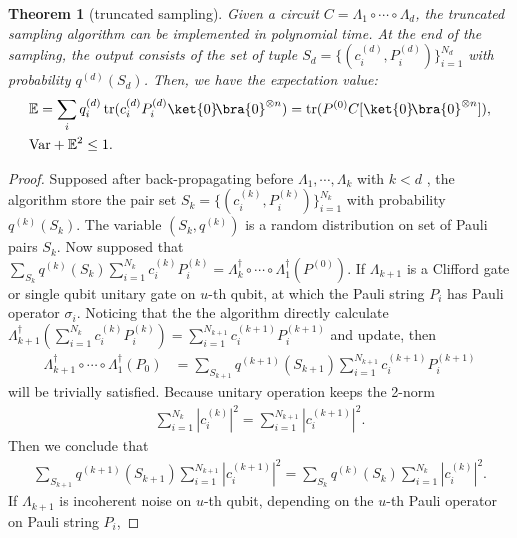 \documentclass[aps,%
twocolumn,%
floatfix,%
pra,%
amsfonts,%
longbibliography,%
groupedaddress,%
superscriptaddress]{revtex4-2}%
\newtheorem{theorem}{Theorem}
\newcommand{\1}{\mathbbm{1}}
\begin{document}
\begin{theorem}[truncated sampling] \label{theo:Multiple-path-sampling-method}
     Given a circuit $C = \Lambda_1 \circ \cdots \circ \Lambda_{d}$, the truncated sampling algorithm can be implemented in polynomial time. At the end of the sampling, the output consists of the set of tuple $S_d = \{(c_i^{(d)}, P_i^{(d)})\}_{i=1}^{N_d}$ with probability $q^{(d)}(S_d)$. Then, we have the expectation value:
\begin{align}
    &\mathbb{E} = \sum_{i} q_i^{(d)} \, \text{tr}(c_i^{(d)} P_i^{(d)} \ket{0}\!\bra{0}^{\otimes n}) = \text{tr}( P^{(0)} C[\ket{0}\!\bra{0}^{\otimes n}] ),\\
        &\text{Var} + \mathbb{E}^2 \leq 1.
\end{align}
\end{theorem}
\begin{proof}
      Supposed after back-propagating before $\Lambda_1, \cdots,\Lambda_k$ with $k < d$ ,  the algorithm store the pair set $ S_k=\{(c_i^{(k)}, P_i^{(k)})\}_{i = 1}^{N_k}$ with probability $q^{(k)}(S_k)$. 
      The variable $(S_k, q^{(k)})$ is a random distribution on set of Pauli pairs $S_k$.
      Now supposed that $\sum_{S_k}q^{(k)}(S_k)\sum_{i =1}^{N_k}  c_i^{(k)}P_i^{(k)} = \Lambda_k^\dagger \circ \cdots\circ\Lambda_1^\dagger(P^{(0)})$. 
  If $\Lambda_{k+1}$ is a Clifford gate or single qubit unitary gate on $u$-th qubit, at which the Pauli string $P_i$ has Pauli operator $\sigma_i$. Noticing that the the algorithm directly calculate $\Lambda_{k+1}^\dagger(\sum_{i =1}^{N_k}c_i^{(k)}P_i^{(k)}) =\sum_{i =1}^{N_{k+1}}c_i^{(k+1)} P_i^{(k+1)}$ and update, then 
      \begin{align}
        \Lambda_{k+1}^\dagger \circ \cdots\circ\Lambda_1^\dagger(P_0) 
        &=\sum_{S_{k+1}}q^{(k+1)}(S_{k+1})\sum_{i =1}^{N_{k+1}}  c_i^{(k+1)}P_i^{(k+1)}
    \end{align}
    will be trivially satisfied. Because unitary operation keeps the 2-norm
    \begin{align}
        \sum_{i =1}^{N_k}|c_i^{(k)}|^2 = \sum_{i =1}^{N_{k+1}}|c_i^{(k+1)}|^2.
    \end{align}
Then we conclude that
\begin{align}
   \sum_{S_{k+1}}q^{(k+1)}(S_{k+1}) \sum_{i= 1}^{N_{k+1}} |c_i^{(k+1)} |^2 
    =  \sum_{S_{k}}q^{(k)}(S_{k}) \sum_{i= 1}^{N_{k}} |c_i^{(k)} |^2.
\end{align}
    If $\Lambda_{k+1}$ is incoherent noise on $u$-th qubit, depending on the $u$-th Pauli operator on Pauli string $P_i$, 

\end{proof}
\end{document}
